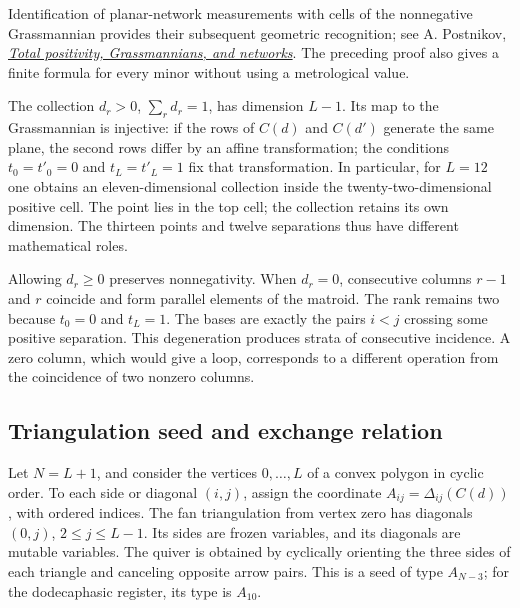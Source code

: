 Identification of planar-network measurements with cells of the
nonnegative Grassmannian provides their subsequent geometric recognition;
see A. Postnikov,
\href{https://arxiv.org/abs/math/0609764}{\emph{Total positivity,
Grassmannians, and networks}}. The preceding proof also gives a finite
formula for every minor without using a metrological value.

The collection \(d_r>0\), \(\sum_rd_r=1\), has dimension \(L-1\).
Its map to the Grassmannian is injective: if the rows of \(C(d)\)
and \(C(d')\) generate the same plane, the second rows differ by an
affine transformation; the conditions \(t_0=t'_0=0\) and
\(t_L=t'_L=1\) fix that transformation. In particular, for \(L=12\)
one obtains an eleven-dimensional collection inside the twenty-two-dimensional
positive cell. The point lies in the top cell; the collection retains its
own dimension. The thirteen points and twelve separations thus have
different mathematical roles.

Allowing \(d_r\ge0\) preserves nonnegativity. When \(d_r=0\),
consecutive columns \(r-1\) and \(r\) coincide and form parallel
elements of the matroid. The rank remains two because \(t_0=0\)
and \(t_L=1\). The bases are exactly the pairs \(i<j\) crossing
some positive separation. This degeneration produces strata of
consecutive incidence. A zero column, which would give a loop,
corresponds to a different operation from the coincidence of two
nonzero columns.

\subsection{Triangulation seed and exchange relation}

Let \(N=L+1\), and consider the vertices \(0,\ldots,L\) of a
convex polygon in cyclic order. To each side or diagonal \((i,j)\),
assign the coordinate \(A_{ij}=\Delta_{ij}(C(d))\), with ordered
indices. The fan triangulation from vertex zero has diagonals
\((0,j)\), \(2\le j\le L-1\). Its sides are frozen variables,
and its diagonals are mutable variables. The quiver is obtained by
cyclically orienting the three sides of each triangle and canceling
opposite arrow pairs. This is a seed of type \(A_{N-3}\); for the
dodecaphasic register, its type is \(A_{10}\).

